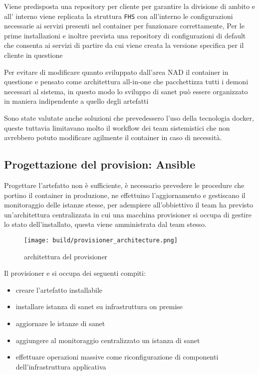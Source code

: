Viene predisposta una repository per cliente per garantire la divisione di ambito e all' interno viene replicata la struttura \verb|FHS| con all'interno le configurazioni necessarie ai servizi presenti nel container per funzionare correttamente, Per le prime installazioni e inoltre prevista una repository di configurazioni di default che consenta ai servizi di partire da cui viene creata la versione specifica per il cliente in questione

Per evitare di modificare quanto sviluppato dall'area NAD il container in questione e pensato come architettura all-in-one che pacchettizza tutti i demoni necessari al sistema, in questo modo lo sviluppo di sanet può essere organizzato in maniera indipendente a quello degli artefatti

Sono state valutate anche soluzioni che prevedessero l'uso della tecnologia docker\cite{docker}, queste tuttavia limitavano molto il workflow dei team sistemistici che non avrebbero potuto modificare agilmente il container in caso di necessità.

\newpage
\subsection{Progettazione del provision: Ansible}

Progettare l'artefatto non è sufficiente, è necessario prevedere le procedure che portino il container in produzione, ne effettuino l'aggiornamento e gestiscano il monitoraggio delle istanze stesse, per adempiere all'obbiettivo il team ha previsto un'architettura centralizzata in cui una macchina provisioner si occupa di gestire lo stato dell'installato, questa viene amministrata dal team stesso.

\begin{figure}[H]
    \centering
    \texttt{[image: build/provisioner\_architecture.png]}
    \caption{architettura del provisioner}
    \label{fig:provisioner_architecture}
\end{figure}

Il provisioner e si occupa dei seguenti compiti:

\begin{itemize}
  \item{creare l'artefatto installabile}
  \item{installare istanza di sanet su infrastruttura on premise }
  \item{aggiornare le istanze di sanet}
  \item{aggiungere al monitoraggio centralizzato un istanza di sanet}
  \item{effettuare operazioni massive come riconfigurazione di componenti dell'infrastruttura applicativa}
\end{itemize}


